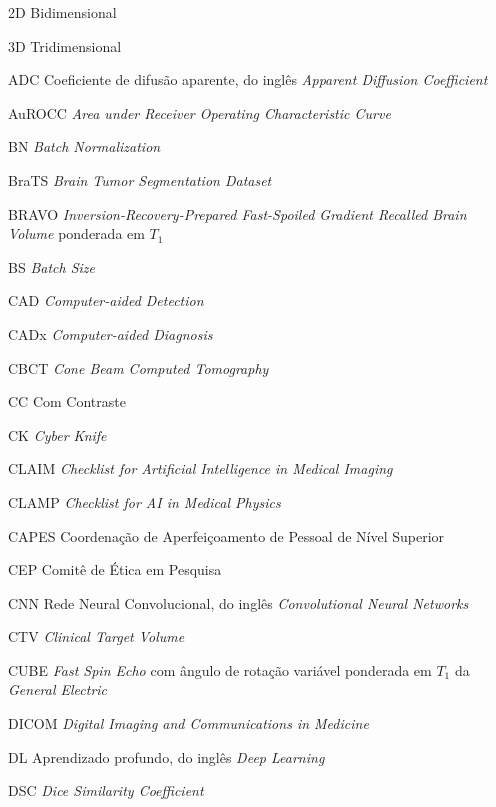 
\begin{siglas}
    \item[2D] Bidimensional
    \item[3D] Tridimensional
    \item[ADC] Coeficiente de difusão aparente, do inglês \textit{Apparent Diffusion Coefficient}
    \item[AuROCC] \textit{Area under Receiver Operating Characteristic Curve}
    \item[BN] \textit{Batch Normalization}
    \item[BraTS] \textit{Brain Tumor Segmentation Dataset}
    \item[BRAVO] \textit{Inversion-Recovery-Prepared Fast-Spoiled Gradient Recalled Brain Volume} ponderada em $T_1$
    \item[BS] \textit{Batch Size}
    \item[CAD] \textit{Computer-aided Detection}
    \item[CADx] \textit{Computer-aided Diagnosis}
    \item[CBCT] \textit{Cone Beam Computed Tomography}
    \item[CC] Com Contraste
    \item[CK] \textit{Cyber Knife}
    \item[CLAIM] \textit{Checklist for Artificial Intelligence in Medical Imaging}
    \item[CLAMP] \textit{Checklist for AI in Medical Physics}
    \item[CAPES] Coordenação de Aperfeiçoamento de Pessoal de Nível Superior
    \item[CEP] Comitê de Ética em Pesquisa
    \item[CNN] Rede Neural Convolucional, do inglês \textit{Convolutional Neural Networks}
    \item[CTV] \textit{Clinical Target Volume}
    \item[CUBE] \textit{Fast Spin Echo} com ângulo de rotação variável ponderada em $T_1$ da \textit{General Electric}
    \item[DICOM] \textit{Digital Imaging and Communications in Medicine}
    \item[DL] Aprendizado profundo, do inglês \textit{Deep Learning}
    \item[DSC] \textit{Dice Similarity Coefficient}

\end{siglas}

